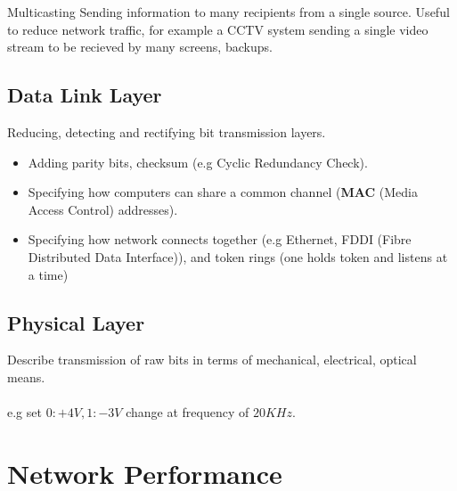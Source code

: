 \begin{sidenotebox}{Multicasting}
    Sending information to many recipients from a single source. Useful to reduce network traffic, for example a CCTV system sending a single video stream to be recieved by many screens, backups.
\end{sidenotebox}

\subsection{Data Link Layer}
Reducing, detecting and rectifying bit transmission layers.
\begin{itemize}
    \setlength\itemsep{0em}
    \item Adding parity bits, checksum (e.g Cyclic Redundancy Check).
    \item Specifying how computers can share a common channel (\textbf{MAC} (Media Access Control) addresses).
    \item Specifying how network connects together (e.g Ethernet, FDDI (Fibre Distributed Data Interface)), and token rings (one holds token and listens at a time)
\end{itemize}

\subsection{Physical Layer}
Describe transmission of raw bits in terms of mechanical, electrical, optical means.
\\
\\ e.g set $0: +4V, 1: -3V$ change at frequency of $20KHz$.

\section{Network Performance}

